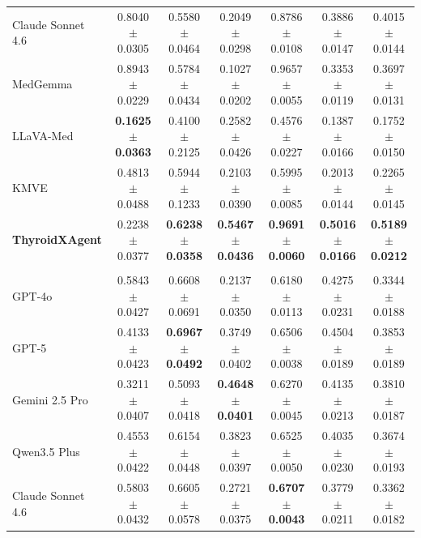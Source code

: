 \documentclass[fleqn,10pt]{wlscirep}
\begin{document}
\begin{appendices}
\begin{table}[p]
\begin{threeparttable}
\begin{tabular}{lcccccc}
Claude Sonnet 4.6
& 0.8040$\pm$0.0305
& 0.5580$\pm$0.0464
& 0.2049$\pm$0.0298
& 0.8786$\pm$0.0108
& 0.3886$\pm$0.0147
& 0.4015$\pm$0.0144 \\

MedGemma~\cite{sellergren2025medgemma}
& 0.8943$\pm$0.0229
& 0.5784$\pm$0.0434
& 0.1027$\pm$0.0202
& 0.9657$\pm$0.0055
& 0.3353$\pm$0.0119
& 0.3697$\pm$0.0131 \\

LLaVA-Med~\cite{li_llavamed_2023}
& \textbf{0.1625$\pm$0.0363}
& 0.4100$\pm$0.2125
& 0.2582$\pm$0.0426
& 0.4576$\pm$0.0227
& 0.1387$\pm$0.0166
& 0.1752$\pm$0.0150 \\

KMVE~\cite{li_ultrasound_2024}
& 0.4813$\pm$0.0488
& 0.5944$\pm$0.1233
& 0.2103$\pm$0.0390
& 0.5995$\pm$0.0085
& 0.2013$\pm$0.0144
& 0.2265$\pm$0.0145 \\

\rowcolor{lightgray}
\textbf{ThyroidXAgent}
& 0.2238$\pm$0.0377
& \textbf{0.6238$\pm$0.0358}
& \textbf{0.5467$\pm$0.0436}
& \textbf{0.9691$\pm$0.0060}
& \textbf{0.5016$\pm$0.0166}
& \textbf{0.5189$\pm$0.0212} \\

\midrule

\rowcolor{gray!20}
\multicolumn{7}{c}{\textbf{KMVE Testset} ($n=492$)} \\

GPT-4o~\cite{openai_gpt4_2024}
& 0.5843$\pm$0.0427
& 0.6608$\pm$0.0691
& 0.2137$\pm$0.0350
& 0.6180$\pm$0.0113
& 0.4275$\pm$0.0231
& 0.3344$\pm$0.0188 \\

GPT-5~\cite{openai2025gpt5systemcard}
& 0.4133$\pm$0.0423
& \textbf{0.6967$\pm$0.0492}
& 0.3749$\pm$0.0402
& 0.6506$\pm$0.0038
& 0.4504$\pm$0.0189
& 0.3853$\pm$0.0189 \\

Gemini 2.5 Pro~\cite{comanici_gemini_2025}
& 0.3211$\pm$0.0407
& 0.5093$\pm$0.0418
& \textbf{0.4648$\pm$0.0401}
& 0.6270$\pm$0.0045
& 0.4135$\pm$0.0213
& 0.3810$\pm$0.0187 \\

Qwen3.5 Plus~\cite{yang_qwen3_2025}
& 0.4553$\pm$0.0422
& 0.6154$\pm$0.0448
& 0.3823$\pm$0.0397
& 0.6525$\pm$0.0050
& 0.4035$\pm$0.0230
& 0.3674$\pm$0.0193 \\

Claude Sonnet 4.6
& 0.5803$\pm$0.0432
& 0.6605$\pm$0.0578
& 0.2721$\pm$0.0375
& \textbf{0.6707$\pm$0.0043}
& 0.3779$\pm$0.0211
& 0.3362$\pm$0.0182 \\


\end{tabular}
\end{threeparttable}
\end{table}
\end{appendices}
\end{document}
